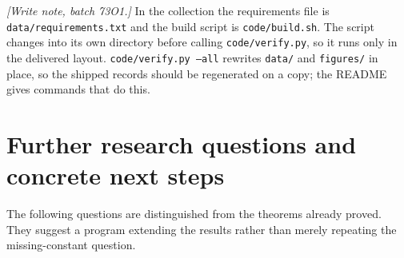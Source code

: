 \documentclass[11pt,a4paper]{article}
\numberwithin{equation}{section}
\theoremstyle{definition}
\newcommand{\code}[1]{\texttt{#1}}
\begin{document}
\emph{[Write note, batch 73O1.]} In the collection the requirements file
is \code{data/requirements.txt} and the build script is
\code{code/build.sh}. The script changes into its own directory before
calling \code{code/verify.py}, so it runs only in the delivered layout.
\code{code/verify.py --all} rewrites \code{data/} and \code{figures/} in
place, so the shipped records should be regenerated on a copy; the README
gives commands that do this.

\section{Further research questions and concrete next steps}\label{tbs:sec:research}

The following questions are distinguished from the theorems already
proved. They suggest a program extending the results rather than
merely repeating the missing-constant question.
\end{document}
